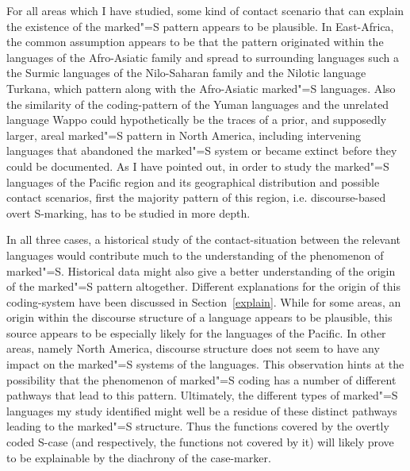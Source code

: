 For all areas which I have studied, some kind of contact scenario that can explain the existence of the marked"=S pattern appears to be plausible. 
In East-Africa, the common assumption appears to be that the pattern originated within the languages of the Afro-Asiatic family and spread to surrounding languages such a the Surmic languages of the Nilo-Saharan family and the Nilotic language Turkana, which pattern along with the Afro-Asiatic marked"=S languages.
Also the similarity of the coding-pattern of the Yuman languages and the unrelated language Wappo could hypothetically be the traces of a prior, and supposedly larger, areal marked"=S pattern in North America, including intervening languages that abandoned the marked"=S system or became extinct before they could be documented.  
As I have pointed out, in order to study the marked"=S languages of the Pacific region and its geographical distribution and possible contact scenarios, first the majority pattern of this region, i.e. discourse-based overt S-marking, has to be studied in more depth.

In all three cases, a historical study of the contact-situation between the relevant languages would contribute much to the understanding of the phenomenon of marked"=S. 
Historical data might also give a better understanding of the origin of the marked"=S pattern altogether. 
Different explanations for the origin of this coding-system have been discussed in Section~\ref{explain}. 
While for some areas, an origin within the discourse structure of a language appears to be plausible, this source appears to be especially likely for the languages of the Pacific.
In other areas, namely North America, discourse structure does not seem to have any impact on the marked"=S systems of the languages.
This observation hints at the possibility that the phenomenon of marked"=S coding has a number of different pathways that lead to this pattern.
Ultimately, the different types of marked"=S languages my study identified might well be a residue of these distinct pathways leading to the marked"=S structure.
Thus the functions covered by the overtly coded S-case (and respectively, the functions not covered by it) will likely prove to be explainable by the diachrony of the case-marker.

